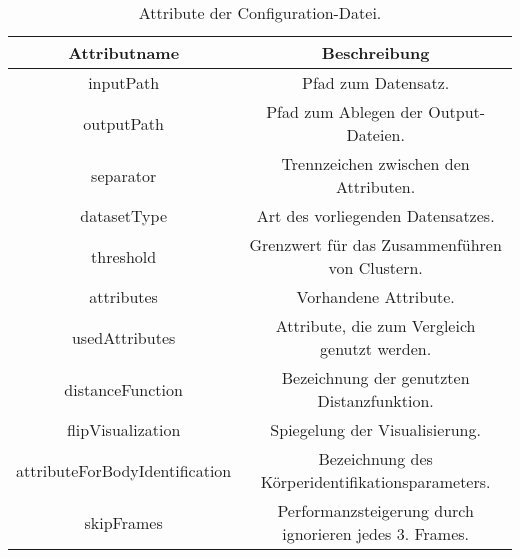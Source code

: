 \begin{table}[ht]
    \begin{center}
        \begin{tabular}{ |c|c| } 
            \hline
            Attributname & Beschreibung \\
            \hline \hline
            inputPath & Pfad zum Datensatz. \\
            \hline
            outputPath & Pfad zum Ablegen der Output-Dateien.  \\
            \hline
            separator & Trennzeichen zwischen den Attributen. \\
            \hline
            datasetType & Art des vorliegenden Datensatzes. \\
            \hline
            threshold & Grenzwert für das Zusammenführen von Clustern. \\
            \hline
            attributes & Vorhandene Attribute. \\
            \hline
            usedAttributes & Attribute, die zum Vergleich genutzt werden. \\
            \hline
            distanceFunction & Bezeichnung der genutzten Distanzfunktion. \\
            \hline
            flipVisualization & Spiegelung der Visualisierung. \\
            \hline
            attributeForBodyIdentification & Bezeichnung des Körperidentifikationsparameters. \\
            \hline
            skipFrames & Performanzsteigerung durch ignorieren jedes 3. Frames. \\
            \hline
        \end{tabular}
        \caption{Attribute der Configuration-Datei.}
        \label{tbl:AttributesConfig}
    \end{center}
\end{table}

